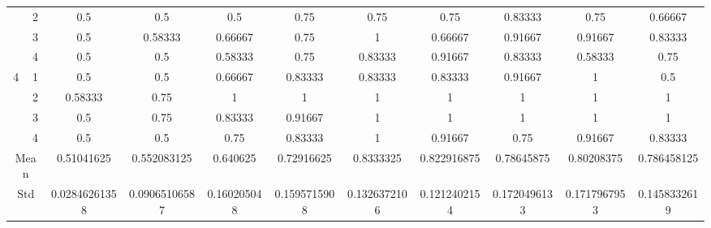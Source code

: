 \documentclass[draft,dvipsnames]{drexel-thesis}
\begin{document}
\begin{thesis}
\begin{table}[!t]
{\begin{tabular}{|c|c|c|c|c|c|c|c|c|c|c|}
                      & 2                   & 0.5           & 0.5           & 0.5         & 0.75         & 0.75         & 0.75         & 0.83333      & 0.75         & 0.66667      \\ \cline{2-11}
                      & 3                   & 0.5           & 0.58333       & 0.66667     & 0.75         & 1            & 0.66667      & 0.91667      & 0.91667      & 0.83333      \\ \cline{2-11}
                      & 4                   & 0.5           & 0.5           & 0.58333     & 0.75         & 0.83333      & 0.91667      & 0.83333      & 0.58333      & 0.75         \\ \hline
\multirow{4}{*}{4}    & 1                   & 0.5           & 0.5           & 0.66667     & 0.83333      & 0.83333      & 0.83333      & 0.91667      & 1            & 0.5          \\ \cline{2-11}
                      & 2                   & 0.58333       & 0.75          & 1           & 1            & 1            & 1            & 1            & 1            & 1            \\ \cline{2-11}
                      & 3                   & 0.5           & 0.75          & 0.83333     & 0.91667      & 1            & 1            & 1            & 1            & 1            \\ \cline{2-11}
                      & 4                   & 0.5           & 0.5           & 0.75        & 0.83333      & 1            & 0.91667      & 0.75         & 0.91667      & 0.83333      \\ \hline
\multicolumn{2}{|c|}{Mean}                  & 0.51041625    & 0.552083125   & 0.640625    & 0.72916625   & 0.8333325    & 0.822916875  & 0.78645875   & 0.80208375   & 0.786458125  \\ \hline
\multicolumn{2}{|c|}{Std}                   & 0.02846261358 & 0.09065106587 & 0.160205048 & 0.1595715908 & 0.1326372106 & 0.1212402154 & 0.1720496133 & 0.1717967953 & 0.1458332619 \\ \hline
\end{tabular}}
\end{table}


\end{thesis}
\end{document}
